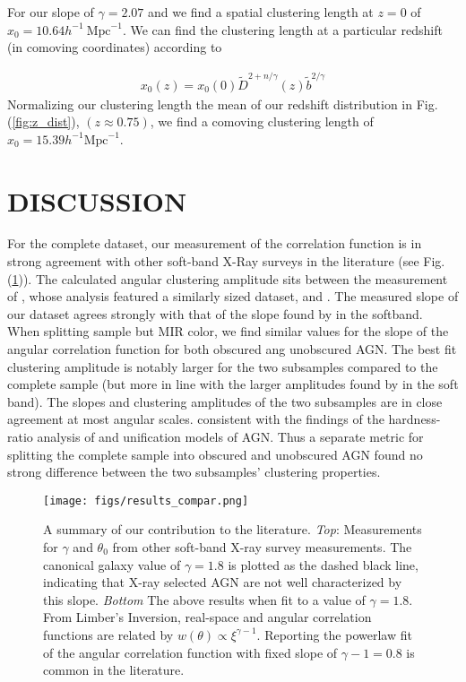 \documentclass[preprint]{aastex63}
\begin{document}
    For our slope of $\gamma = 2.07$ and we find a spatial clustering length at 
    $z = 0$ of $x_0 = 10.64 h^{-1} \  \text{Mpc}^{-1}$. We can find the clustering length at a particular redshift 
     (in comoving coordinates) according to 
    
    
    \begin{align}
        \label{eq:clustering_length}
        x_0(z) = x_0(0) \tilde D^{2+n/\gamma}(z) \tilde b^{2/\gamma}
    \end{align}
    Normalizing our clustering length the mean of our redshift distribution in Fig. (\ref{fig:z_dist}), $(z \approx 0.75)$, we find a comoving clustering length 
    of $x_0 = 15.39 h^{-1} \text{Mpc}^{-1}$.


\section{DISCUSSION}
For the complete dataset, our measurement of the correlation function is in strong agreement
with other soft-band X-Ray surveys in the literature (see Fig. (\ref{fig:comp})). The calculated angular clustering amplitude 
sits between the measurement of \cite{ebrero}, whose analysis featured a similarly sized dataset, and \cite{elyiv}. The 
measured slope of our dataset agrees strongly with that of the slope found by \cite{ebrero} in the softband. When splitting sample but MIR color, we find similar values for the slope 
of the angular correlation function for both obscured ang unobscured AGN. The best fit clustering amplitude is notably larger for the two subsamples compared to the complete sample 
(but more in line with the larger amplitudes found by \citet{ebrero} in the soft band). The slopes and clustering amplitudes of the two subsamples are in close agreement at most angular scales.
consistent with the findings of the hardness-ratio analysis of  \cite{ebrero} and unification models of AGN.
Thus a separate metric for splitting the complete sample into obscured and unobscured AGN found no strong difference
between the two subsamples' clustering properties.

\begin{figure}[!ht]
    \centering
    \texttt{[image: figs/results\_compar.png]}
    \label{fig:comp}
    \caption{A summary of our contribution to the literature. \textit{Top}: Measurements for $\gamma$ and $\theta_0$
    from other soft-band X-ray survey measurements. The canonical galaxy value of  $\gamma = 1.8$ is plotted as the dashed black line,
    indicating that X-ray selected AGN are not well characterized by this slope. \textit{Bottom} The above results when fit to a value of 
    $\gamma = 1.8$. From Limber's Inversion, real-space and angular correlation functions are related by $w(\theta) \propto \xi^{\gamma - 1}$. 
    Reporting the powerlaw fit of the angular correlation function with fixed slope of $\gamma - 1 = 0.8$ is common 
    in the literature. 
    }
\end{figure}
\end{document}
